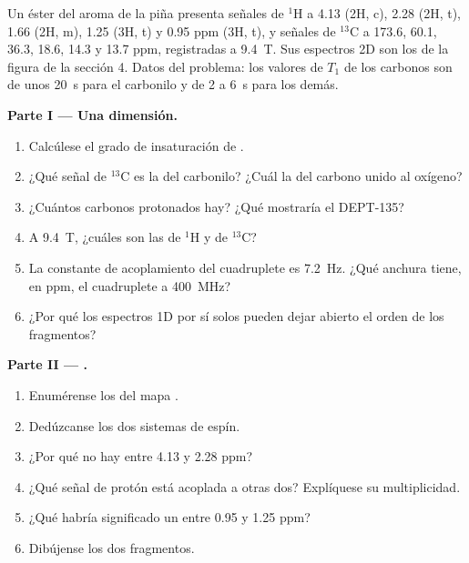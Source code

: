 \begin{problem}
\label{pb:b3:advanced-nmr:1}
Un éster  del aroma de la piña presenta señales de ${}^1$H a 4.13 (2H,
c), 2.28 (2H, t), 1.66 (2H, m), 1.25 (3H, t) y 0.95 ppm (3H, t), y señales de ${}^{13}$C
a 173.6, 60.1, 36.3, 18.6, 14.3 y 13.7 ppm, registradas a \qty{9.4}{T}. Sus espectros 2D
son los de la figura de la sección 4. Datos del problema: los valores de $T_1$
de los carbonos son de unos \qty{20}{s} para el carbonilo y de 2 a \qty{6}{s} para los
demás.

\medskip\noindent\textbf{Parte I --- Una dimensión.}
\begin{enumerate}
  \item Calcúlese el grado de insaturación de .
  \item ¿Qué señal de ${}^{13}$C es la del carbonilo? ¿Cuál la del carbono unido al oxígeno?
  \item ¿Cuántos carbonos protonados hay? ¿Qué mostraría el DEPT-135?
  \item A \qty{9.4}{T}, ¿cuáles son las  de ${}^1$H y de ${}^{13}$C?
  \item La constante de acoplamiento del cuadruplete es \qty{7.2}{Hz}. ¿Qué anchura tiene, en ppm, el
        cuadruplete a \qty{400}{MHz}?
  \item ¿Por qué los espectros 1D por sí solos pueden dejar abierto el orden de los fragmentos?
\end{enumerate}

\medskip\noindent\textbf{Parte II --- .}
\begin{enumerate}[resume]
  \item Enumérense los  del mapa .
  \item Dedúzcanse los dos sistemas de espín.
  \item ¿Por qué no hay  entre 4.13 y 2.28 ppm?
  \item ¿Qué señal de protón está acoplada a otras dos? Explíquese su multiplicidad.
  \item ¿Qué habría significado un  entre 0.95 y 1.25 ppm?
  \item Dibújense los dos fragmentos.
\end{enumerate}


\end{problem}
